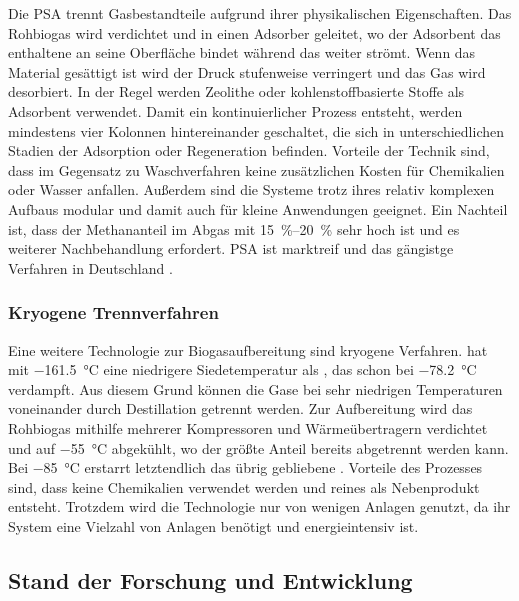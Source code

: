 Die \gls{PSA} trennt Gasbestandteile aufgrund ihrer physikalischen Eigenschaften. Das Rohbiogas wird verdichtet und in einen Adsorber geleitet, wo der Adsorbent das enthaltene  an seine Oberfläche bindet während das  weiter strömt. Wenn das Material gesättigt ist wird der Druck stufenweise verringert und das Gas wird desorbiert. In der Regel werden Zeolithe oder kohlenstoffbasierte Stoffe als Adsorbent verwendet. Damit ein kontinuierlicher Prozess entsteht, werden mindestens vier Kolonnen hintereinander geschaltet, die sich in unterschiedlichen Stadien der Adsorption oder Regeneration befinden. Vorteile der Technik sind, dass im Gegensatz zu Waschverfahren keine zusätzlichen Kosten für Chemikalien oder Wasser anfallen. Außerdem sind die Systeme trotz ihres relativ komplexen Aufbaus modular und damit auch für kleine Anwendungen geeignet. Ein Nachteil ist, dass der Methananteil im Abgas mit \SIrange{15}{20}{\percent} sehr hoch ist und es weiterer Nachbehandlung erfordert. \gls{PSA} ist marktreif und das gängistge Verfahren in Deutschland \parencite{Grom17}. \parencite{BHPT13} \parencite{KGKK2019} 


\subsubsection{Kryogene Trennverfahren}\label{chap:kryo}

Eine weitere Technologie zur Biogasaufbereitung sind kryogene Verfahren.  hat mit \SI{-161,5}{\degreeCelsius} eine niedrigere Siedetemperatur als , das schon bei \SI{-78,2}{\degreeCelsius} verdampft. Aus diesem Grund können die Gase bei sehr niedrigen Temperaturen voneinander durch Destillation getrennt werden. Zur Aufbereitung wird das Rohbiogas mithilfe mehrerer Kompressoren und Wärmeübertragern verdichtet und auf \SI{-55}{\degreeCelsius} abgekühlt, wo der größte Anteil  bereits abgetrennt werden kann. Bei \SI{-85}{\degreeCelsius} erstarrt letztendlich das übrig gebliebene .   
Vorteile des Prozesses sind, dass keine Chemikalien verwendet werden und reines  als Nebenprodukt entsteht. Trotzdem wird die Technologie nur von wenigen Anlagen genutzt, da ihr System eine Vielzahl von Anlagen benötigt und energieintensiv ist.  \parencite{KGKK2019} \parencite{AONC2019} 


\subsection{Stand der Forschung und Entwicklung}

